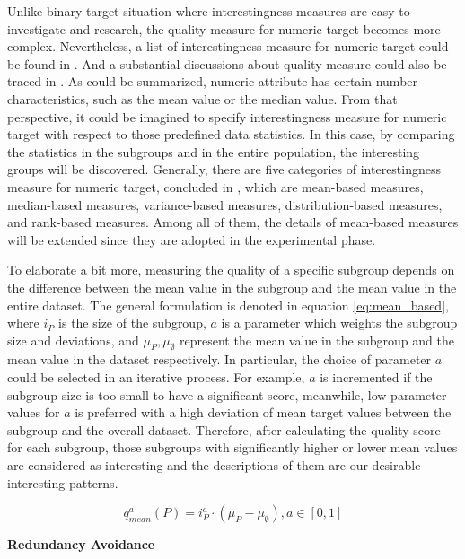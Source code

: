 Unlike binary target situation where interestingness measures are easy to investigate and research, the quality measure for numeric target becomes more complex. Nevertheless, a list of interestingness measure for numeric target could be found in \cite{klosgen2002data}. And a substantial discussions about quality measure could also be traced in \cite{pieters2010subgroup}. As could be summarized, numeric attribute has certain number characteristics, such as the mean value or the median value. From that perspective, it could be imagined to specify interestingness measure for numeric target with respect to those predefined data statistics. In this case, by comparing the statistics in the subgroups and in the entire population, the interesting groups will be discovered. Generally, there are five categories of interestingness measure for numeric target, concluded in \cite{lemmerich2014novel}, which are mean-based measures, median-based measures, variance-based measures, distribution-based measures, and rank-based measures. Among all of them, the details of mean-based measures will be extended since they are adopted in the experimental phase. 

To elaborate a bit more, measuring the quality of a specific subgroup depends on the difference between the mean value in the subgroup and the mean value in the entire dataset. The general formulation is denoted in equation \ref{eq:mean_based}, where $i_{P}$ is the size of the subgroup, $a$ is a parameter which weights the subgroup size and deviations, and $\mu_{P}, \mu_{\emptyset}$ represent the mean value in the subgroup and the mean value in the dataset respectively. In particular, the choice of parameter $a$ could be selected in an iterative process. For example, $a$ is incremented if the subgroup size is too small to have a significant score, meanwhile, low parameter values for $a$ is preferred with a high deviation of mean target values between the subgroup and the overall dataset. Therefore, after calculating the quality score for each subgroup, those subgroups with significantly higher or lower mean values are considered as interesting and the descriptions of them are our desirable interesting patterns. 

\begin{equation}  \label{eq:mean_based}
q_{m e a n}^{a}(P)=i_{P}^{a} \cdot\left(\mu_{P}-\mu_{\emptyset}\right), a \in[0,1]
\end{equation}

\textbf{Redundancy Avoidance}


